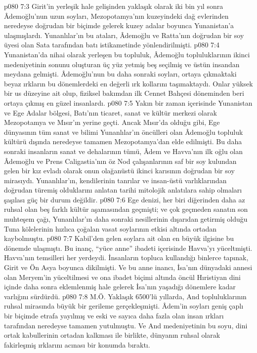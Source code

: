 \vs p080 7:3 Girit’in yerleşik hale gelişinden yaklaşık olarak iki bin yıl sonra Âdemoğlu’nun uzun soyları, Mezopotamya’nın kuzeyindeki dağ evlerinden neredeyse doğrudan bir biçimde gelerek kuzey adalar boyunca Yunanistan’a ulaşmışlardı. Yunanlılar’ın bu ataları, Âdemoğlu ve Ratta’nın doğrudan bir soy üyesi olan Sata tarafından batı istikametinde yönlendirilmişti.
\vs p080 7:4 Yunanistan’da nihai olarak yerleşen bu topluluk, Âdemoğlu topluluklarının ikinci medeniyetinin sonunu oluşturan üç yüz yetmiş beş seçilmiş ve üstün insandan meydana gelmişti. Âdemoğlu’nun bu daha sonraki soyları, ortaya çıkmaktaki beyaz ırkların bu dönemlerdeki en değerli ırk kollarını taşımaktaydı. Onlar yüksek bir us düzeyine ait olup, fiziksel bakımdan ilk Cennet Bahçesi döneminden beri ortaya çıkmış en güzel insanlardı.
\vs p080 7:5 Yakın bir zaman içerisinde Yunanistan ve Ege Adalar bölgesi, Batı’nın ticaret, sanat ve kültür merkezi olarak Mezopotamya ve Mısır’ın yerine geçti. Ancak Mısır’da olduğu gibi, Ege dünyasının tüm sanat ve bilimi Yunanlılar’ın öncülleri olan Âdemoğlu topluluk kültürü dışında neredeyse tamamen Mezopotamya’dan elde edilmişti. Bu daha sonraki insanların sanat ve dehalarının tümü, Âdem ve Havva’nın ilk oğlu olan Âdemoğlu ve Prens Caligastia’nın öz Nod çalışanlarının saf bir soy kulundan gelen bir kız evladı olarak onun olağanüstü ikinci karısının doğrudan bir soy mirasıydı. Yunanlılar’ın, kendilerinin tanrılar ve insan\hyp{}üstü varlıklarından doğrudan türemiş olduklarını anlatan tarihi mitolojik anlatılara sahip olmaları şaşılası güç bir durum değildir.
\vs p080 7:6 Ege denizi, her biri diğerinden daha az ruhsal olan beş farklı kültür aşamasından geçmişti; ve çok geçmeden sanatın son muhteşem çağı, Yunanlılar’ın daha sonraki nesillerinin dışarıdan getirmiş olduğu Tuna kölelerinin hızlıca çoğalan vasat soylarının etkisi altında ortadan kaybolmuştu.
\vs p080 7:7 Kabil’den gelen soylara ait olan  en büyük ilgisine bu dönemde ulaşmıştı. Bu inanç, “yüce anne” ibadeti içerisinde Havva’yı yüceltmişti. Havva’nın temsilleri her yerdeydi. İnsanların topluca kullandığı binlerce tapınak, Girit ve Ön Asya boyunca dikilmişti. Ve bu anne inancı, İsa’nın dünyadaki annesi olan Meryem’in yüceltilmesi ve ona ibadet biçimi altında öncül Hıristiyan dini içinde daha sonra eklemlenmiş hale gelerek İsa’nın yaşadığı dönemlere kadar varlığını sürdürdü.
\vs p080 7:8 M.Ö. Yaklaşık 6500’lü yıllarda, And topluluklarının ruhsal mirasında büyük bir gerileme gerçekleşmişti. Âdem’in soyları geniş çaplı bir biçimde etrafa yayılmış ve eski ve sayıca daha fazla olan insan ırkları tarafından neredeyse tamamen yutulmuştu. Ve And medeniyetinin bu soyu, dini ortak kabullerinin ortadan kalkması ile birlikte, dünyanın ruhsal olarak fakirleşmiş ırklarını acınası bir konumda bıraktı.
